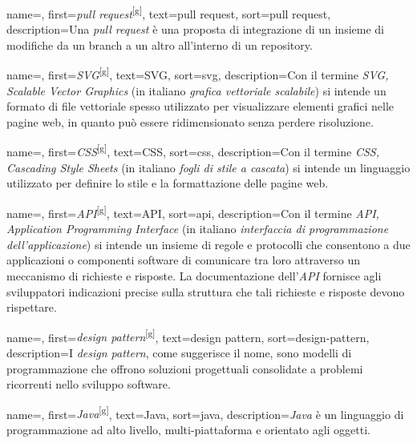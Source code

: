  {
    name=,
    first={\textit{pull request}\textsuperscript{[g]}},
    text=pull request,
    sort=pull request,
    description={Una \textit{pull request} è una proposta di integrazione di un insieme di modifiche da un branch a un altro all’interno di un \gls{repository}.}
}

 {
    name=,
    first={\textit{SVG}\textsuperscript{[g]}},
    text=SVG,
    sort=svg,
    description={Con il termine \textit{SVG, Scalable Vector Graphics} (in italiano \textit{grafica vettoriale scalabile}) si intende un formato di file vettoriale spesso utilizzato per visualizzare elementi grafici nelle pagine web, in quanto può essere ridimensionato senza perdere risoluzione.}
}

 {
    name=,
    first={\textit{CSS}\textsuperscript{[g]}},
    text=CSS,
    sort=css,
    description={Con il termine \textit{CSS, Cascading Style Sheets} (in italiano \textit{fogli di stile a cascata}) si intende un linguaggio utilizzato per definire lo stile e la formattazione delle pagine web.}
}

 {
    name=,
    first={\textit{API}\textsuperscript{[g]}},
    text=API,
    sort=api,
    description={Con il termine \textit{API, Application Programming Interface} (in italiano \textit{interfaccia di programmazione dell'applicazione}) si intende un insieme di regole e protocolli che consentono a due applicazioni o componenti software di comunicare tra loro attraverso un meccanismo di richieste e risposte. La documentazione dell'\textit{API} fornisce agli sviluppatori indicazioni precise sulla struttura che tali richieste e risposte devono rispettare.}
}

 {
    name=,
    first={\textit{design pattern}\textsuperscript{[g]}},
    text=design pattern,
    sort=design-pattern,
    description={I \textit{design pattern}, come suggerisce il nome, sono modelli di programmazione che offrono soluzioni progettuali consolidate a problemi ricorrenti nello sviluppo software.}
}

 {
    name=,
    first={\textit{Java}\textsuperscript{[g]}},
    text=Java,
    sort=java,
    description={\textit{Java} è un linguaggio di programmazione ad alto livello, multi-piattaforma e orientato agli oggetti.}
}

